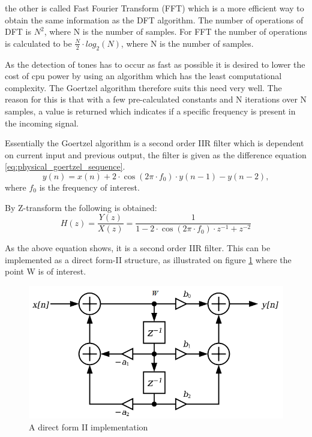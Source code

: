 	
	the other is called Fast Fourier Transform (FFT) which is a more efficient way to obtain the same information
	as the DFT algorithm. The number of operations of DFT \cite[p. 124]{DSP} is $N^2$, where N is the number of samples.
	For FFT \cite[p. 124]{DSP} the number of operations is calculated to be $\frac{N}{2}\cdot log_{2}(N)$,
	where N is the number of samples.
	
	As the detection of tones has to occur as fast as possible it is desired to lower the cost of cpu power by using 
	an algorithm which has the least computational complexity. The Goertzel algorithm therefore suits this need very well.
	The reason for this is that with a few pre-calculated constants and N iterations over N samples, a value is returned
	which indicates if a specific frequency is present in the incoming signal.
	
	Essentially the Goertzel algorithm is a second order IIR filter which is dependent on current input and previous
	output, the filter is given as the difference equation \ref{eq:physical_goertzel_sequence}.
	\begin{equation}y(n) = x(n) + 2\cdot \cos(2\pi \cdot f_{0})\cdot y(n - 1) - y(n - 2),\end{equation}\label{eq:physical_goertzel_sequence}
	where $f_{0}$ is the frequency of interest.
	
	By Z-transform the following is obtained:
	\begin{equation}H(z) = \frac{Y(z)}{X(z)} = \frac{1}{1 - 2\cdot \cos(2\pi \cdot f_{0})\cdot z^{-1} + z^{-2}}\end{equation}
	
	
	As the above equation shows, it is a second order IIR filter. This can be implemented as a direct form-II structure, as illustrated on figure \ref{fig:physical_biquad_filter} where the point W is of interest.
	
	\begin{figure}[htb]
		\begin{center}
		\includegraphics[scale=0.6,trim=0 0 0 0]{content/graphics/physical/physical_biquad_filter.png}%
		\caption{A direct form II implementation}
		\label{fig:physical_biquad_filter}
		\end{center}
	\end{figure}
	
